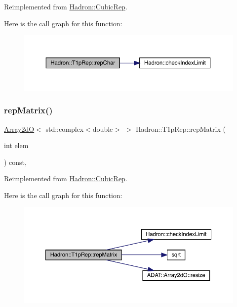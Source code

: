 Reimplemented from \mbox{\hyperlink{structHadron_1_1CubicRep_af45227106e8e715e84b0af69cd3b36f8}{Hadron\+::\+Cubic\+Rep}}.

Here is the call graph for this function\+:
\nopagebreak
\begin{figure}[H]
\begin{center}
\leavevmode
\includegraphics[width=350pt]{df/dba/structHadron_1_1T1pRep_ad5fd4bf6eaa8fd1a465bd6757d7b4379_cgraph}
\end{center}
\end{figure}
\mbox{\label{structHadron_1_1T1pRep_ad013f454206c3e9f9b7c78db7812df97}} 
\subsubsection{\texorpdfstring{repMatrix()}{repMatrix()}\hspace{0.1cm}{\footnotesize\ttfamily [1/2]}}
{\footnotesize\ttfamily \mbox{\hyperlink{classADAT_1_1Array2dO}{Array2dO}}$<$ std\+::complex$<$double$>$ $>$ Hadron\+::\+T1p\+Rep\+::rep\+Matrix (\begin{DoxyParamCaption}\item[{int}]{elem }\end{DoxyParamCaption}) const\hspace{0.3cm}{\ttfamily [inline]}, {\ttfamily [virtual]}}



Reimplemented from \mbox{\hyperlink{structHadron_1_1CubicRep_ac5d7e9e6f4ab1158b5fce3e4ad9e8005}{Hadron\+::\+Cubic\+Rep}}.

Here is the call graph for this function\+:
\nopagebreak
\begin{figure}[H]
\begin{center}
\leavevmode
\includegraphics[width=350pt]{df/dba/structHadron_1_1T1pRep_ad013f454206c3e9f9b7c78db7812df97_cgraph}
\end{center}
\end{figure}
\mbox{\label{structHadron_1_1T1pRep_ad013f454206c3e9f9b7c78db7812df97}} 
